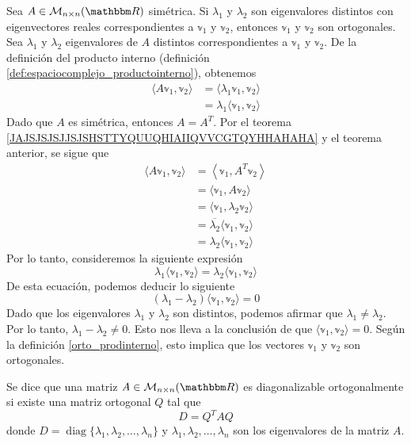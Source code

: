 \begin{theorem}\label{theorem_simetrica2}
    Sea $A \in \mathcal{M}_{n \times n}(\RR)$ simétrica. Si $\lambda_1$ y $\lambda_2$ son eigenvalores distintos con eigenvectores reales correspondientes a $\mathbb{v}_1$ y $\mathbb{v}_2$, entonces $\mathbb{v}_1$ y $\mathbb{v}_2$ son ortogonales. \\
    \demostracion Sea $\lambda_1$ y $\lambda_2$ eigenvalores de $A$ distintos correspondientes a $\mathbb{v}_1$ y $\mathbb{v}_2$. De la definición del producto interno (definición \ref{def:espaciocomplejo_productointerno}), obtenemos
    \begin{align*}
        \langle A\mathbb{v}_1, \mathbb{v}_2 \rangle & = \langle \lambda_1 \mathbb{v}_1, \mathbb{v}_2 \rangle \\
        & = \lambda_1 \langle \mathbb{v}_1, \mathbb{v}_2 \rangle
    \end{align*}
    Dado que $A$ es simétrica, entonces $A = A^T$. Por el teorema \ref{JAJSJSJSJJSJSHSTTYQUUQHIAIIQVVCGTQYHHAHAHA} y el teorema anterior, se sigue que
    \begin{align*}
        \langle A\mathbb{v}_1, \mathbb{v}_2 \rangle & = \left\langle \mathbb{v}_1, A^T \mathbb{v}_2 \right\rangle \\
        & = \langle \mathbb{v}_1, A\mathbb{v}_2 \rangle \\
        & = \langle \mathbb{v}_1, \lambda_2 \mathbb{v}_2 \rangle \\
        & = \overline{\lambda_2} \langle \mathbb{v}_1, \mathbb{v}_2 \rangle \\
        & = \lambda_2 \langle \mathbb{v}_1, \mathbb{v}_2 \rangle
    \end{align*}
    Por lo tanto, consideremos la siguiente expresión
    $$\lambda_1 \langle \mathbb{v}_1, \mathbb{v}_2 \rangle = \lambda_2 \langle \mathbb{v}_1, \mathbb{v}_2 \rangle$$
    De esta ecuación, podemos deducir lo siguiente
    $$(\lambda_1 - \lambda_2) \langle \mathbb{v}_1, \mathbb{v}_2 \rangle = 0$$
    Dado que los eigenvalores $\lambda_1$ y $\lambda_2$ son distintos, podemos afirmar que $\lambda_1 \neq \lambda_2$. Por lo tanto, $\lambda_1 - \lambda_2 \neq 0$. Esto nos lleva a la conclusión de que $\langle \mathbb{v}_1, \mathbb{v}_2 \rangle = 0$. Según la definición \ref{orto_prodinterno}, esto implica que los vectores $\mathbb{v}_1$ y $\mathbb{v}_2$ son ortogonales.
\end{theorem}

\newpage

\begin{definition}
    Se dice que una matriz $A \in \mathcal{M}_{n \times n}(\RR)$ es diagonalizable ortogonalmente si existe una matriz ortogonal $Q$ tal que
    $$D = Q^{T}AQ$$
    donde $D = \operatorname{diag} \{ \lambda_1, \lambda_2, \dots, \lambda_n \}$ y $\lambda_1, \lambda_2, \dots, \lambda_n$ son los eigenvalores de la matriz $A$.
\end{definition}

